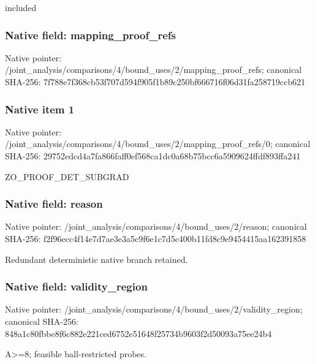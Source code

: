 \documentclass[10pt,a4paper]{article}
\begin{document}
\begingroup\raggedright\sloppy included\par\endgroup

\subsubsection{Native field: mapping\_\allowbreak{}proof\_\allowbreak{}refs}
Native pointer: /joint\_\allowbreak{}analysis/comparisons/4/bound\_\allowbreak{}uses/2/mapping\_\allowbreak{}proof\_\allowbreak{}refs; canonical SHA-256: 7f788e7f368cb53f707d594f905f1b89c250bf666716f06d31fa258719ccb621

\subsubsection{Native item 1}
Native pointer: /joint\_\allowbreak{}analysis/comparisons/4/bound\_\allowbreak{}uses/2/mapping\_\allowbreak{}proof\_\allowbreak{}refs/0; canonical SHA-256: 29752edcd4a7fa866faff0ef568ca1dc0a68b75bcc6a5909624ffdf893ffa241

\begingroup\raggedright\sloppy ZO\_\allowbreak{}PROOF\_\allowbreak{}DET\_\allowbreak{}SUBGRAD\par\endgroup

\subsubsection{Native field: reason}
Native pointer: /joint\_\allowbreak{}analysis/comparisons/4/bound\_\allowbreak{}uses/2/reason; canonical SHA-256: f2f96ecc4f14e7d7ae3e3a5c9f6e1c7d5c400b11fd8c9e9454415aa162391858

\begingroup\raggedright\sloppy Redundant deterministic native branch retained.\par\endgroup

\subsubsection{Native field: validity\_\allowbreak{}region}
Native pointer: /joint\_\allowbreak{}analysis/comparisons/4/bound\_\allowbreak{}uses/2/validity\_\allowbreak{}region; canonical SHA-256: 848a1c80fbbe8f6c882e221ced6752e51648f25734b9603f2d50093a75ee24b4

\begingroup\raggedright\sloppy A>=\allowbreak{}8;\allowbreak{} feasible ball-restricted probes.\par\endgroup
\end{document}
